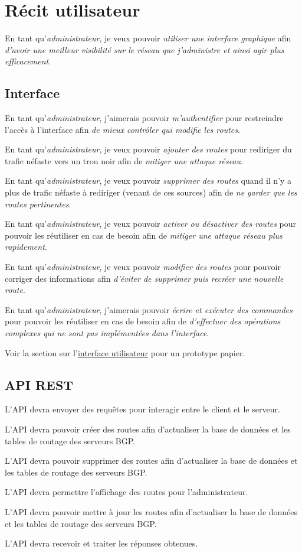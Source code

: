 \chapter{Récit utilisateur}

 En tant qu'\textit{administrateur}, je veux pouvoir \textit{utiliser une interface graphique} afin \textit{d'avoir une meilleur visibilité sur le réseau que j'administre et ainsi agir plus efficacement}.

\section{Interface}

En tant qu'\textit{administrateur}, j'aimerais pouvoir \textit{m'authentifier} pour restreindre l'accès à l'interface afin \textit{de mieux contrôler qui modifie les routes}.\bigskip

En tant qu'\textit{administrateur}, je veux pouvoir \textit{ajouter des routes} pour rediriger du trafic néfaste vers un trou noir afin de \textit{mitiger une attaque réseau}.\bigskip

En tant qu'\textit{administrateur}, je veux pouvoir \textit{supprimer des routes} quand il n'y a plus de trafic néfaste à rediriger (venant de ces sources) afin de \textit{ne garder que les routes pertinentes}.\bigskip

En tant qu'\textit{administrateur}, je veux pouvoir \textit{activer ou désactiver des routes} pour pouvoir les réutiliser en cas de besoin afin de \textit{mitiger une attaque réseau plus rapidement}.\bigskip

En tant qu'\textit{administrateur}, je veux pouvoir \textit{modifier des routes} pour pouvoir corriger des informations afin \textit{d'éviter de supprimer puis recréer une nouvelle route}.\bigskip

 En tant qu'\textit{administrateur}, j'aimerais pouvoir \textit{écrire et exécuter des commandes} pour pouvoir les réutiliser en cas de besoin afin de \textit{d'effectuer des opérations complexes qui ne sont pas implémentées dans l'interface}.\bigskip

Voir la section sur l'\hyperref[sssec:ui]{interface utilisateur} pour un prototype papier.
 \newpage

\section{API REST}
L'API devra envoyer des requêtes pour interagir entre le client et le serveur.\bigskip

L'API devra pouvoir créer des routes afin d'actualiser la base de données et les tables de routage des serveurs BGP.\bigskip

L'API devra pouvoir supprimer des routes afin d'actualiser la base de données et les tables de routage des serveurs BGP.\bigskip

L'API devra permettre l'affichage des routes pour l'administrateur.\bigskip

L'API devra pouvoir mettre à jour les routes afin d'actualiser la base de données et les tables de routage des serveurs BGP.\bigskip

L'API devra recevoir et traiter les réponses obtenues.\bigskip
